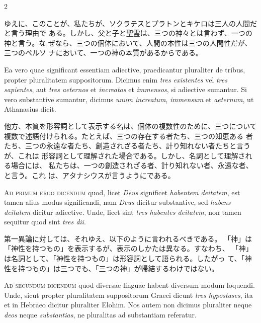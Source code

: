 \documentclass[paper=a4paper,fontsize=10pt,jafontsize=9pt,titlepage]{jlreq}
\begin{document}
\begin{paracol}{2}
\switchcolumn

ゆえに、このことが、私たちが、ソクラテスとプラトンとキケロは三人の人間だと言う理由で
 ある。しかし、父と子と聖霊は、三つの神々とは言わず、一つの神と言う。な
 ぜなら、三つの個体において、人間の本性は三つの人間性だが、三つのペルソ
 ナにおいて、一つの神の本質があるからである。

\switchcolumn*

Ea vero
quae significant essentiam adiective, praedicantur pluraliter de tribus,
propter pluralitatem suppositorum. Dicimus enim {\itshape tres existentes} vel {\itshape tres
sapientes}, aut {\itshape tres aeternos} et {\itshape increatos} et {\itshape immensos}, si adiective
sumantur. Si vero substantive sumantur, dicimus {\itshape unum increatum}, {\itshape immensum}
et {\itshape aeternum}, ut Athanasius dicit.

\switchcolumn

他方、本質を形容詞として表示する名は、個体の複数性のために、三つについて
 複数で述語付けられる。たとえば、三つの存在する者たち、三つの知恵ある
 者たち、三つの永遠な者たち、創造されざる者たち、計り知れない者たちと言うが、これは
 形容詞として理解された場合である。しかし、名詞として理解される場合には、
 私たちは、一つの創造されざる者、計り知れない者、永遠な者、と言う。これ
 は、アタナシウスが言うようにである。

\switchcolumn*

{\scshape Ad primum ergo dicendum} quod, licet {\itshape Deus} significet {\itshape habentem deitatem},
est tamen alius modus significandi, nam {\itshape Deus} dicitur substantive, sed
{\itshape habens deitatem} dicitur adiective. Unde, licet sint {\itshape tres habentes
deitatem}, non tamen sequitur quod sint {\itshape tres dii}.

\switchcolumn

第一異論に対しては、それゆえ、以下のように言われるべきである。
「神」は「神性を持つもの」を表示するが、表示のしかたは異なる。すなわち、
 「神」は名詞として、「神性を持つもの」は形容詞として語られる。したがっ
 て、「神性を持つもの」は三つでも、「三つの神」が帰結するわけではない。

\switchcolumn*

{\scshape Ad secundum dicendum} quod diversae linguae habent diversum modum
loquendi. Unde, sicut propter pluralitatem suppositorum Graeci dicunt
{\itshape tres hypostases}, ita et in Hebraeo dicitur pluraliter Elohim. Nos autem
non dicimus pluraliter neque {\itshape deos} neque {\itshape substantias}, ne pluralitas ad
substantiam referatur.


\end{paracol}
\end{document}
